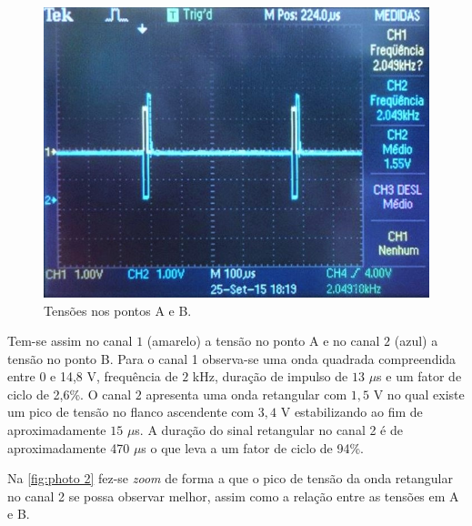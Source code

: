 \documentclass[a4paper,11pt]{article}
\numberwithin{equation}{section}
\begin{document}
\begin{figure}[h]
	\centering
	\includegraphics[keepaspectratio=true, scale=0.55]{img/fig4}
	\caption{Tensões nos pontos A e B.}
	\label{fig:photo 1}
	\vspace{-0.8em}
\end{figure}

Tem-se assim no canal $1$ (amarelo) a tensão no ponto A e no canal $2$ (azul) a tensão no ponto B. Para o canal 1 observa-se uma onda quadrada compreendida entre 0 e 14,8 V, frequência de $2$ kHz, duração de impulso de $13$ $\mu$s e um fator de ciclo de 2,6\%. O canal $2$ apresenta uma onda retangular com $1,5$ V no qual existe um pico de tensão no flanco ascendente com $3,4$ V estabilizando ao fim de aproximadamente $15$ $\mu$s. A duração do sinal retangular no canal 2 é de aproximadamente 470 $\mu$s o que leva a um fator de ciclo de 94\%.

Na \autoref{fig:photo 2} fez-se \textit{zoom} de forma a que o pico de tensão da onda retangular no canal 2 se possa observar melhor, assim como a relação entre as tensões em A e B.

\pagebreak
\end{document}
